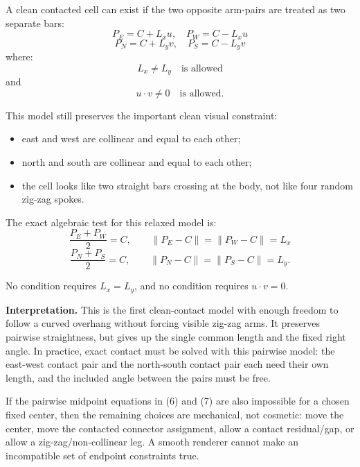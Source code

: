 \documentclass[11pt,letterpaper]{article}
\begin{document}
A clean contacted cell can exist if the two opposite arm-pairs are treated as two separate bars:
\[
P_E=C+L_xu,\quad P_W=C-L_xu
\]
\[
P_N=C+L_yv,\quad P_S=C-L_yv
\]
where:
\[
L_x \neq L_y \quad \text{is allowed}
\]
and
\[
u\cdot v \neq 0 \quad \text{is allowed.}
\]

This model still preserves the important clean visual constraint:
\begin{itemize}
  \item east and west are collinear and equal to each other;
  \item north and south are collinear and equal to each other;
  \item the cell looks like two straight bars crossing at the body, not like four random zig-zag spokes.
\end{itemize}

The exact algebraic test for this relaxed model is:
\[
\frac{P_E+P_W}{2}=C,\qquad \|P_E-C\|=\|P_W-C\|=L_x
\tag{6}
\]
\[
\frac{P_N+P_S}{2}=C,\qquad \|P_N-C\|=\|P_S-C\|=L_y.
\tag{7}
\]

No condition requires \(L_x=L_y\), and no condition requires \(u\cdot v=0\).

\textbf{Interpretation.} This is the first clean-contact model with enough freedom to follow a curved overhang without forcing visible zig-zag arms. It preserves pairwise straightness, but gives up the single common length and the fixed right angle. In practice, exact contact must be solved with this pairwise model: the east-west contact pair and the north-south contact pair each need their own length, and the included angle between the pairs must be free.

If the pairwise midpoint equations in (6) and (7) are also impossible for a chosen fixed center, then the remaining choices are mechanical, not cosmetic: move the center, move the contacted connector assignment, allow a contact residual/gap, or allow a zig-zag/non-collinear leg. A smooth renderer cannot make an incompatible set of endpoint constraints true.
\end{document}
